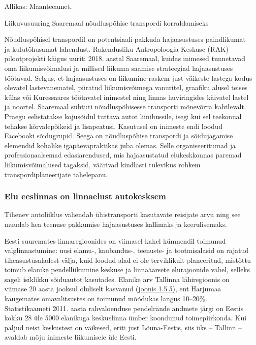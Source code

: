 \documentclass[estonian,]{article}
\begin{document}
\begin{imgsource}
{Allikas:} Maanteeamet.
\end{imgsource}

\begin{casebox}
Liikuvusuuring Saaremaal nõudluspõhise transpordi korraldamiseks

Nõudluspõhisel transpordil on potentsiaali pakkuda hajaasustuses
paindlikumat ja kulutõhusamat lahendust. Rakendusliku Antropoloogia
Keskuse (RAK) pilootprojekti käigus uuriti 2018. aastal Saaremaal,
kuidas inimesed tunnetavad oma liikumisvõimalusi ja millised liikuma
saamise strateegiad hajaasustuses töötavad. Selgus, et hajaasustuses on
liikumine raskem just väikeste lastega kodus olevatel lastevanematel,
piiratud liikumisvõimega vanuritel, graafiku alusel teises külas või
Kuressaares töötavatel inimestel ning linnas huviringides käivatel
lastel ja noortel. Saaremaal suhtuti nõudluspõhisesse transporti
mõnevõrra kahtlevalt. Praegu eelistatakse kojusõidul tuttava autot
liinibussile, isegi kui sel teekonnal tehakse kõrvalepõikeid ja
lisapeatusi. Kasutusel on inimeste endi loodud Facebooki sõidugrupid.
Seega on nõudluspõhise transpordi ja sõidujagamise elemendid kohalike
igapäevapraktikas juba olemas. Selle organiseeritumad ja
professionaalsemad edasiarendused, mis hajaasustatud elukeskkonnas
paremad liikumisvõimalused tagaksid, väärivad kindlasti tulevikus rohkem
transpordiplaneerijate tähelepanu.
\end{casebox}

\hypertarget{elu-eeslinnas-on-linnaelust-autokesksem}{%
\subsubsection*{Elu eeslinnas on linnaelust autokesksem}\label{elu-eeslinnas-on-linnaelust-autokesksem}}

\begin{blockquote-right}
Tihenev autoliiklus vähendab ühistransporti kasutavate reisijate arvu
ning see muudab hea teenuse pakkumise hajaasustuses kallimaks ja
keerulisemaks.
\end{blockquote-right}

Eesti suuremates linnaregioonides on viimasel kahel kümnendil toimunud valglinnastumine: uusi elamu-, kaubandus-, teenuste- ja tootmisalasid on rajatud tiheasustusaladest välja, kuid loodud alad ei ole terviklikult planeeritud, mistõttu toimub elanike pendelliikumine keskuse ja linnaäärsete elurajoonide vahel, selleks sageli isiklikku sõiduautot kasutades. Elanike arv Tallinna lähiregioonis on viimase 20 aasta jooksul oluliselt kasvanud (\protect\hyperlink{figure155}{joonis 1.5.5}), ent Harjumaa kaugemates omavalitsustes on toimunud mõõdukas langus 10--20\%. Statistikaameti 2011. aasta rahvaloenduse pendelrände andmete järgi on Eestis kokku 28 üle 5000 elanikuga keskuslinna ümber koondunud toimepiirkonda. Kui paljud neist keskustest on väikesed, eriti just Lõuna-Eestis, siis üks -- Tallinn -- avaldab mõju inimeste liikumisele üle Eesti.
\end{document}
